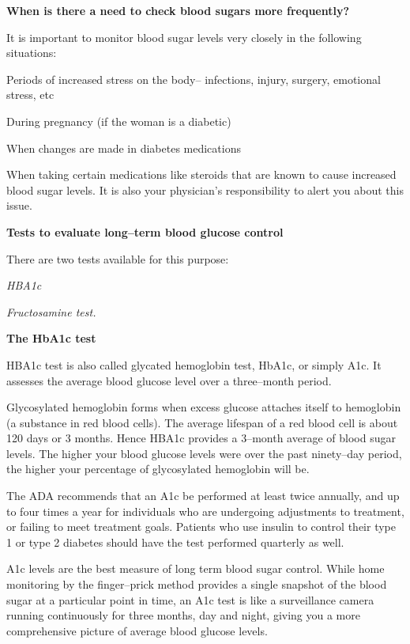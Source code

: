 \textbf{When is there a need to check blood sugars more frequently?}

It is important to monitor blood sugar levels very closely in the following situations:

\item Periods of increased stress on the body– infections, injury, surgery, emotional stress, etc

 \item During pregnancy (if the woman is a diabetic)

 \item When changes are made in diabetes medications

 \item When taking certain medications like steroids that are known to cause increased blood sugar levels. It is also your physician’s responsibility to alert you about this issue.

\textbf{Tests to evaluate long–term blood glucose control}

There are two tests available for this purpose:

\item \textit{HBA1c}

 \item \textit{Fructosamine test.}

\textbf{The HbA1c test}

HBA1c test is also called glycated hemoglobin test, HbA1c, or simply A1c. It assesses the average blood glucose level over a three–month period.

Glycosylated hemoglobin forms when excess glucose attaches itself to hemoglobin (a substance in red blood cells). The average lifespan of a red blood cell is about 120 days or 3 months. Hence HBA1c provides a 3–month average of blood sugar levels. The higher your blood glucose levels were over the past ninety–day period, the higher your percentage of glycosylated hemoglobin will be.

The ADA recommends that an A1c be performed at least twice annually, and up to four times a year for individuals who are undergoing adjustments to treatment, or failing to meet treatment goals. Patients who use insulin to control their type 1 or type 2 diabetes should have the test performed quarterly as well.

A1c levels are the best measure of long term blood sugar control. While home monitoring by the finger–prick method provides a single snapshot of the blood sugar at a particular point in time, an A1c test is like a surveillance camera running continuously for three months, day and night, giving you a more comprehensive picture of average blood glucose levels.

